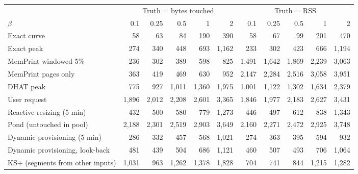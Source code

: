 \begin{tabular}{lrrrrrrrrrr}
\toprule
 & \multicolumn{5}{c}{Truth = bytes touched} & \multicolumn{5}{c}{Truth = RSS} \\
\cmidrule(lr){2-6} \cmidrule(lr){7-11}
$\beta$ & 0.1 & 0.25 & 0.5 & 1 & 2 & 0.1 & 0.25 & 0.5 & 1 & 2 \\
\midrule
Exact curve & 58 & 63 & 84 & 190 & 390 & 58 & 67 & 99 & 201 & 470 \\
Exact peak & 274 & 340 & 448 & 693 & 1{,}162 & 233 & 302 & 423 & 666 & 1{,}194 \\
MemPrint windowed 5\% & 236 & 302 & 389 & 598 & 825 & 1{,}491 & 1{,}642 & 1{,}869 & 2{,}239 & 3{,}063 \\
MemPrint pages only & 363 & 419 & 469 & 630 & 952 & 2{,}147 & 2{,}284 & 2{,}516 & 3{,}058 & 3{,}951 \\
DHAT peak & 775 & 927 & 1{,}011 & 1{,}360 & 1{,}975 & 1{,}001 & 1{,}122 & 1{,}302 & 1{,}634 & 2{,}379 \\
User request & 1{,}896 & 2{,}012 & 2{,}208 & 2{,}601 & 3{,}365 & 1{,}846 & 1{,}977 & 2{,}183 & 2{,}627 & 3{,}431 \\
Reactive resizing (5 min) & 432 & 500 & 580 & 779 & 1{,}273 & 446 & 497 & 612 & 838 & 1{,}343 \\
Pond (untouched in pool) & 2{,}188 & 2{,}301 & 2{,}519 & 2{,}903 & 3{,}649 & 2{,}160 & 2{,}271 & 2{,}472 & 2{,}925 & 3{,}748 \\
Dynamic provisioning (5 min) & 286 & 332 & 457 & 568 & 1{,}021 & 274 & 363 & 395 & 594 & 932 \\
Dynamic provisioning, look-back & 481 & 439 & 504 & 686 & 1{,}121 & 460 & 507 & 493 & 706 & 1{,}064 \\
KS+ (segments from other inputs) & 1{,}031 & 963 & 1{,}262 & 1{,}378 & 1{,}828 & 704 & 741 & 844 & 1{,}215 & 1{,}282 \\
\bottomrule
\end{tabular}

